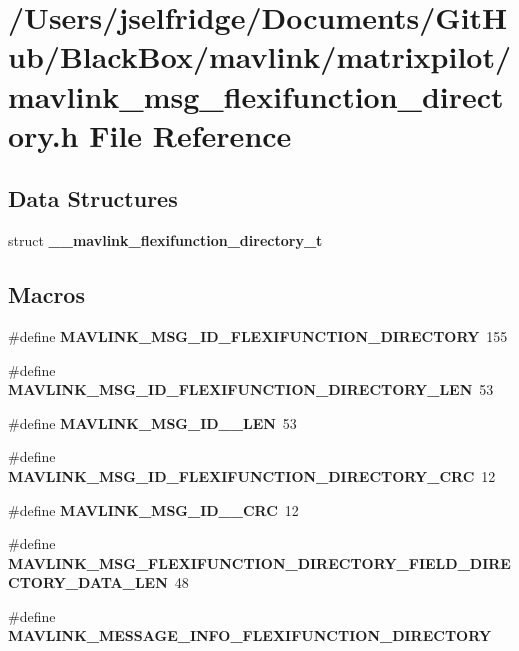 \section{/\+Users/jselfridge/\+Documents/\+Git\+Hub/\+Black\+Box/mavlink/matrixpilot/mavlink\+\_\+msg\+\_\+flexifunction\+\_\+directory.h File Reference}
\label{mavlink__msg__flexifunction__directory_8h}
\subsection*{Data Structures}
\begin{DoxyCompactItemize}
\item 
struct \textbf{ \+\_\+\+\_\+mavlink\+\_\+flexifunction\+\_\+directory\+\_\+t}
\end{DoxyCompactItemize}
\subsection*{Macros}
\begin{DoxyCompactItemize}
\item 
\#define \textbf{ M\+A\+V\+L\+I\+N\+K\+\_\+\+M\+S\+G\+\_\+\+I\+D\+\_\+\+F\+L\+E\+X\+I\+F\+U\+N\+C\+T\+I\+O\+N\+\_\+\+D\+I\+R\+E\+C\+T\+O\+RY}~155
\item 
\#define \textbf{ M\+A\+V\+L\+I\+N\+K\+\_\+\+M\+S\+G\+\_\+\+I\+D\+\_\+\+F\+L\+E\+X\+I\+F\+U\+N\+C\+T\+I\+O\+N\+\_\+\+D\+I\+R\+E\+C\+T\+O\+R\+Y\+\_\+\+L\+EN}~53
\item 
\#define \textbf{ M\+A\+V\+L\+I\+N\+K\+\_\+\+M\+S\+G\+\_\+\+I\+D\+\_\+\_\+\+L\+EN}~53
\item 
\#define \textbf{ M\+A\+V\+L\+I\+N\+K\+\_\+\+M\+S\+G\+\_\+\+I\+D\+\_\+\+F\+L\+E\+X\+I\+F\+U\+N\+C\+T\+I\+O\+N\+\_\+\+D\+I\+R\+E\+C\+T\+O\+R\+Y\+\_\+\+C\+RC}~12
\item 
\#define \textbf{ M\+A\+V\+L\+I\+N\+K\+\_\+\+M\+S\+G\+\_\+\+I\+D\+\_\+\_\+\+C\+RC}~12
\item 
\#define \textbf{ M\+A\+V\+L\+I\+N\+K\+\_\+\+M\+S\+G\+\_\+\+F\+L\+E\+X\+I\+F\+U\+N\+C\+T\+I\+O\+N\+\_\+\+D\+I\+R\+E\+C\+T\+O\+R\+Y\+\_\+\+F\+I\+E\+L\+D\+\_\+\+D\+I\+R\+E\+C\+T\+O\+R\+Y\+\_\+\+D\+A\+T\+A\+\_\+\+L\+EN}~48
\item 
\#define \textbf{ M\+A\+V\+L\+I\+N\+K\+\_\+\+M\+E\+S\+S\+A\+G\+E\+\_\+\+I\+N\+F\+O\+\_\+\+F\+L\+E\+X\+I\+F\+U\+N\+C\+T\+I\+O\+N\+\_\+\+D\+I\+R\+E\+C\+T\+O\+RY}
\end{DoxyCompactItemize}

